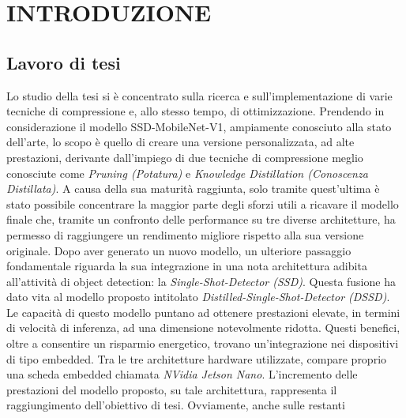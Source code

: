 
\chapter{INTRODUZIONE}
\label{Capitolo1}
\thispagestyle{empty}

\section{Lavoro di tesi}
Lo studio della tesi si è concentrato sulla ricerca e sull'implementazione 
di varie tecniche di compressione e, allo stesso tempo, di ottimizzazione. 
Prendendo in considerazione il modello SSD-MobileNet-V1, ampiamente 
conosciuto alla stato dell'arte, lo scopo è quello di creare una versione 
personalizzata, ad alte prestazioni, derivante dall'impiego di due tecniche 
di compressione meglio conosciute come \emph{Pruning (Potatura)} e \emph{Knowledge 
Distillation (Conoscenza Distillata)}. A causa della sua maturità 
raggiunta, solo tramite quest'ultima è stato possibile concentrare la maggior parte 
degli sforzi utili a ricavare il modello finale che, tramite un confronto delle 
performance su tre diverse architetture, ha permesso di raggiungere un 
rendimento migliore rispetto alla sua versione originale. Dopo aver generato 
un nuovo modello, un ulteriore passaggio fondamentale riguarda la 
sua integrazione in una nota architettura adibita all'attività di object detection: 
la \emph{Single-Shot-Detector (SSD)}. Questa fusione ha dato vita al modello proposto 
intitolato \emph{Distilled-Single-Shot-Detector (DSSD)}. Le capacità di 
questo modello puntano ad ottenere prestazioni elevate, in termini di velocità di 
inferenza, ad una dimensione notevolmente ridotta. Questi benefici, oltre a 
consentire un risparmio energetico, trovano un'integrazione nei dispositivi 
di tipo embedded. Tra le tre architetture hardware utilizzate, compare 
proprio una scheda embedded chiamata \emph{NVidia Jetson Nano}. L'incremento 
delle prestazioni del modello proposto, su tale architettura, rappresenta 
il raggiungimento dell'obiettivo di tesi. Ovviamente, anche sulle restanti 

